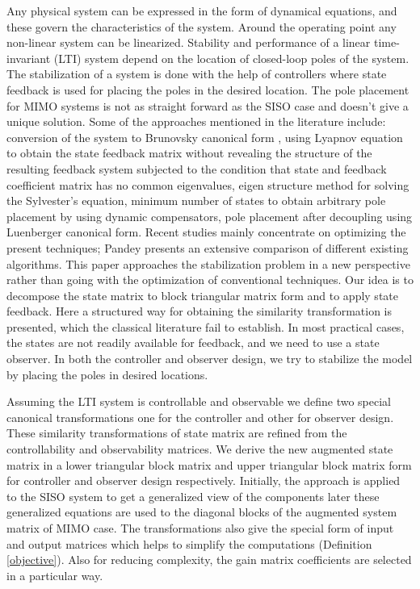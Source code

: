 \documentclass{elsarticle}
\numberwithin{equation}{section}
\begin{document}
Any physical system can be expressed in the form of dynamical equations, and these govern the characteristics of the system. Around the operating point any non-linear system can be linearized. Stability and performance of a linear time-invariant (LTI) system depend on the location of closed-loop poles\cite{1698024} of the system. The stabilization of a system is done with the help of controllers where state feedback is used for placing the poles in the desired location\cite{KALMAN1960491}. The pole placement for MIMO systems is not as straight forward as the SISO case and doesn't give a unique solution. Some of the approaches mentioned in the literature\cite{1099056} include: conversion of the system to Brunovsky canonical form \cite{hermida1996brunovsky}, using Lyapnov equation to obtain the state feedback matrix without revealing the structure of the resulting feedback system subjected to the condition that state and feedback coefficient matrix has no common eigenvalues\cite{chen1999linear}, eigen structure method\cite{dooren} for solving the Sylvester's equation\cite{bhattac}, minimum number of states to obtain arbitrary pole placement by using dynamic compensators\cite{1099352}, pole placement after decoupling using Luenberger canonical form\cite{5250892}\cite{325034}. Recent studies mainly concentrate on optimizing the present techniques; Pandey\cite{7039881} presents an extensive comparison of different existing algorithms. This paper approaches the stabilization problem in a new perspective rather than going with the optimization of conventional techniques. Our idea is to decompose the state matrix to block triangular matrix form\cite{1098739} and to apply state feedback. Here a structured way for obtaining the similarity transformation is presented, which the classical literature fail to establish. In most practical cases, the states are not readily available for feedback, and we need to use a state observer. In both the controller and observer design, we try to stabilize the model by placing the poles in desired locations.

Assuming the LTI system is controllable and observable we define two special canonical transformations one for the controller and other for observer design. These similarity transformations of state matrix are refined from the controllability and observability matrices. We derive the new augmented state matrix in a lower triangular block matrix and upper triangular block matrix form for controller and observer design respectively. Initially, the approach is applied to the SISO system to get a generalized view of the components later these generalized equations are used to the diagonal blocks of the augmented system matrix of MIMO case. The transformations also give the special form of input and output matrices which helps to simplify the computations (Definition \ref{objective}). Also for reducing complexity, the gain matrix coefficients are selected in a particular way.
\end{document}
